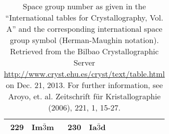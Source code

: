 \documentclass[11pt,a4paper]{report}
\begin{document}
\begin{table}[H]
\begin{center}
\begin{tabular}{||r|l||r|l||r|l||r|l||r|l||}
229    & Im$\bar{3}$m       & 
230    & Ia$\bar{3}$d       \\
\hline
\end{tabular}
\end{center}
\caption{\label{table:spacegroupnumber_b}Space group number as given
  in the ``International tables for Crystallography, Vol. A'' and the
  corresponding international space group symbol (Herman-Maughin
  notation). Retrieved from the Bilbao Crystallographic Server
  \url{http://www.cryst.ehu.es/cryst/text/table.html} on Dec. 21,
  2013.  For further information, see Aroyo, et. al. Zeitschrift f\"ur
  Kristallographie (2006), 221, 1, 15-27.  }
\end{table}

\clearpage



\end{document}
